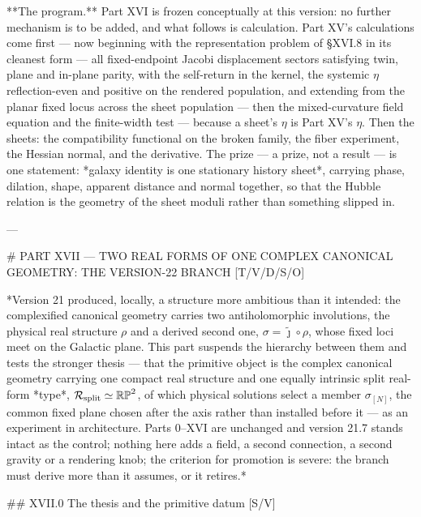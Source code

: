 **The program.** Part XVI is frozen conceptually at this version: no further mechanism is to be added, and what follows is calculation. Part XV's calculations come first — now beginning with the representation problem of §XVI.8 in its cleanest form — all fixed-endpoint Jacobi displacement sectors satisfying twin, plane and in-plane parity, with the self-return in the kernel, the systemic $\eta$ reflection-even and positive on the rendered population, and extending from the planar fixed locus across the sheet population — then the mixed-curvature field equation and the finite-width test — because a sheet's $\eta$ is Part XV's $\eta$. Then the sheets: the compatibility functional on the broken family, the fiber experiment, the Hessian normal, and the derivative. The prize — a prize, not a result — is one statement: *galaxy identity is one stationary history sheet*, carrying phase, dilation, shape, apparent distance and normal together, so that the Hubble relation is the geometry of the sheet moduli rather than something slipped in.

---

# PART XVII — TWO REAL FORMS OF ONE COMPLEX CANONICAL GEOMETRY: THE VERSION-22 BRANCH [T/V/D/S/O]

*Version 21 produced, locally, a structure more ambitious than it intended: the complexified canonical geometry carries two antiholomorphic involutions, the physical real structure $\rho$ and a derived second one, $\sigma = \widetilde\jmath\circ\rho$, whose fixed loci meet on the Galactic plane. This part suspends the hierarchy between them and tests the stronger thesis — that the primitive object is the complex canonical geometry carrying one compact real structure and one equally intrinsic split real-form *type*, $\mathcal R_{\rm split}\simeq\mathbb{RP}^2$, of which physical solutions select a member $\sigma_{[N]}$, the common fixed plane chosen after the axis rather than installed before it — as an experiment in architecture. Parts 0–XVI are unchanged and version 21.7 stands intact as the control; nothing here adds a field, a second connection, a second gravity or a rendering knob; the criterion for promotion is severe: the branch must derive more than it assumes, or it retires.*

## XVII.0 The thesis and the primitive datum [S/V]

